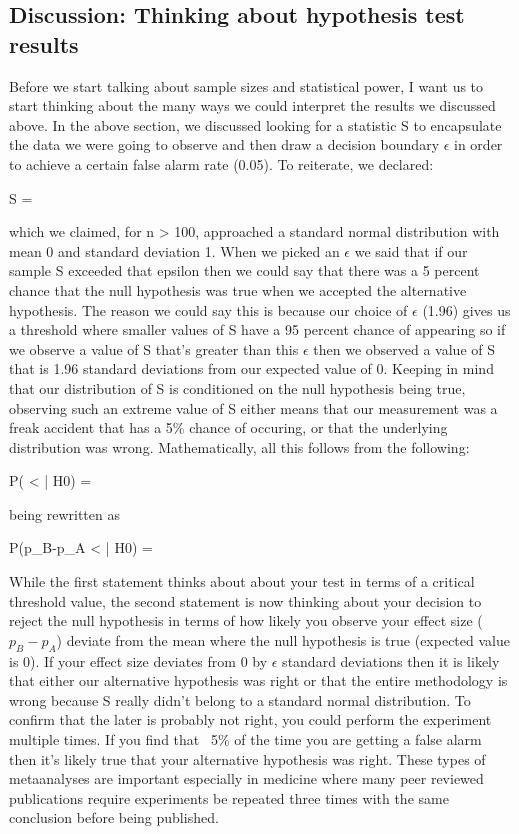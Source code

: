 \subsection{Discussion: Thinking about hypothesis test results}

Before we start talking about sample sizes and statistical power, I want us to start thinking about the many ways we could interpret 
the results we discussed above. In the above section, we discussed looking for a statistic S to encapsulate the data we were
going to observe and then draw a decision boundary $\epsilon$ in order to achieve a certain false alarm rate (0.05). To reiterate, 
we declared:

\beq
S = 
\eeq 

which we claimed, for n > 100, approached a standard normal distribution with mean 0 and standard deviation 1. 
When we picked an $\epsilon$ we said that if our sample S exceeded that epsilon then we could say that there was a 5 percent chance 
that the null hypothesis was true when we accepted the alternative hypothesis. The reason we could say this is because our choice
of $\epsilon$ (1.96) gives us a threshold where smaller values of S have a 95 percent chance of appearing so if we observe a value of S that's greater 
than this $\epsilon$ then we observed a value of S that is 1.96 standard deviations from our expected value of 0. Keeping in mind that our distribution 
of S is conditioned on the null hypothesis being true, observing such an extreme value of S either means that our measurement 
was a freak accident that has a 5\% chance of occuring, or that the underlying distribution was wrong. Mathematically, all this follows from the following:

\beq 
P( < \epsilon | H0) = \alpha
\eeq

being rewritten as 

\beq 
P(p_B-p_A < \epsilon\hat{\sigma} | H0) = \alpha
\eeq

While the first statement thinks about about your test in terms of a critical threshold value, the second statement is
now thinking about your decision to reject the null hypothesis in terms of how likely you observe your effect size ($p_B-p_A$) 
deviate from the mean where the null hypothesis is true (expected value is 0). If your effect size deviates from 0 by $\epsilon$
standard deviations then it is likely that either our alternative hypothesis was right or that the entire methodology is wrong because S 
really didn't belong to a standard normal distribution. To confirm that the later is probably not right, you could perform the experiment 
multiple times. If you find that ~5\% of the time you are getting a false alarm then it's likely true that your alternative hypothesis was 
right. These types of metaanalyses are important especially in medicine where many peer reviewed publications require experiments be repeated 
three times with the same conclusion before being published.


